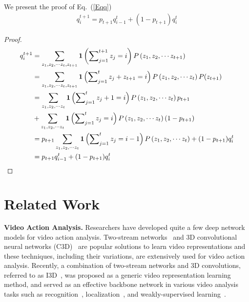 \documentclass{article} \usepackage{iclr2019_conference,times}
\begin{document}
We present the proof of Eq.~(\ref{Eqq})
\begin{align}
q_i^{t + 1} = {p_{t + 1}}q_{i - 1}^t + (1 - {p_{t + 1}})q_i^t
\label{Eqq}
\end{align}

\begin{proof}
\begin{align}
q_i^{t + 1} & = \sum\limits_{{z_1},{z_2},\cdots{z_t},{z_{t + 1}}} {{\bf{1}}\left( {\sum\nolimits_{j = 1}^{t + 1} {{z_j} = i} } \right)P\left( {{z_1},{z_2},\cdots{z_{t + 1}}} \right)} \\
& = \sum\limits_{{z_1},{z_2},\cdots{z_t},{z_{t + 1}}} {{\bf{1}}\left( {\sum\nolimits_{j = 1}^t {{z_j} + {z_{t + 1}} = i} } \right)P\left( {{z_1},{z_2},\cdots{z_t}} \right)P({z_{t + 1}})} \\ 
& = \sum\limits_{{z_1},{z_2},\cdots{z_t}} {{\bf{1}}\left( {\sum\nolimits_{j = 1}^t {{z_j} + 1 = i} } \right)P\left( {{z_1},{z_2},\cdots{z_t}} \right){p_{t + 1}}  } \\   & + \sum\limits_{{z_1},{z_2},\cdots{z_t}} {{\bf{1}}\left( {\sum\nolimits_{j = 1}^t {{z_j} = i} } \right)P\left( {{z_1},{z_2},\cdots{z_t}} \right)(1 - {p_{t + 1}})} \\
&  = {p_{t + 1}}\sum\limits_{{z_1},{z_2},\cdots{z_t}} {{\bf{1}}\left( {\sum\nolimits_{j = 1}^t {{z_j} = i - 1} } \right)P\left( {{z_1},{z_2},\cdots{z_t}} \right)}  + (1 - {p_{t + 1}})q_i^t \\
& = {p_{t + 1}}q_{i - 1}^t + (1 - {p_{t + 1}})q_i^t
\end{align}


\end{proof}


\section{Related Work}\label{related_work}

\textbf{Video Action Analysis.} 
Researchers have developed quite a few deep network models for video action analysis. Two-stream networks~\citep{simonyan2014two} and 3D convolutional neural networks (C3D)~\citep{tran2015learning} are popular solutions to learn video representations and these techniques, including their variations, are extensively used for video action analysis. Recently, a combination of two-stream networks and 3D convolutions, referred to as I3D~\citep{I3D}, was proposed as a generic video representation learning method, and served as an effective backbone network in various video analysis tasks such as recognition~\citep{wang2016temporal}, localization~\citep{shou2016temporal}, and weakly-supervised learning~\citep{wang2017untrimmednets}.
\end{document}
